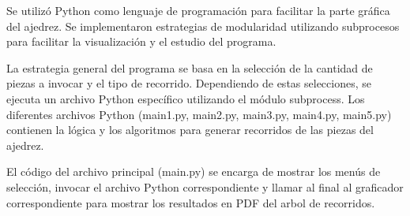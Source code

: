 Se utilizó Python como lenguaje de programación para facilitar la parte gráfica del ajedrez. Se implementaron estrategias de modularidad utilizando subprocesos para facilitar la visualización y el estudio del programa.\newline

La estrategia general del programa se basa en la selección de la cantidad de piezas a invocar y el tipo de recorrido. Dependiendo de estas selecciones, se ejecuta un archivo Python específico utilizando el módulo subprocess. Los diferentes archivos Python (main1.py, main2.py, main3.py, main4.py, main5.py) contienen la lógica y los algoritmos para generar recorridos de las piezas del ajedrez.\newline

El código del archivo principal (main.py) se encarga de mostrar los menús de selección, invocar el archivo Python correspondiente y llamar al final al graficador correspondiente para mostrar los resultados en PDF del arbol de recorridos.\newline

